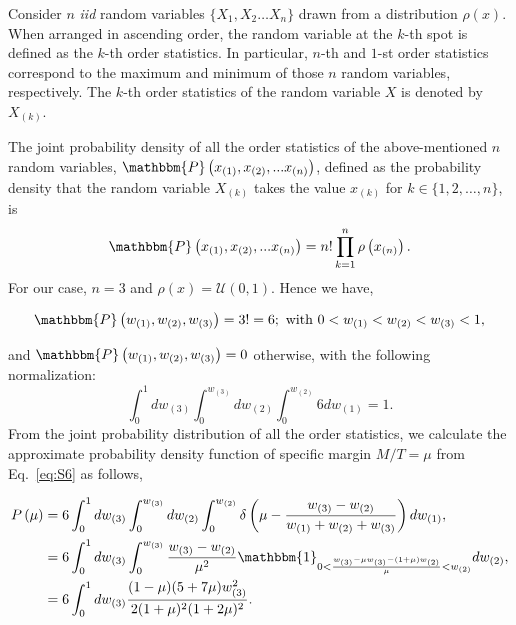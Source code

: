 \documentclass[reprint,aps,prl,showpacs,twocolumn, superscriptaddress]{revtex4-2}
\begin{document}
Consider $n$ \emph{iid} random variables $\{X_1, X_2 \dots X_n\}$ drawn from a distribution $\rho(x)$. When arranged in ascending order, the random variable at the $k$-th spot is defined as the $k$-th order statistics. In particular, $n$-th and $1$-st order statistics correspond to the maximum and minimum of those $n$ random variables, respectively. The $k$-th order statistics of the random variable $X$ is denoted by $X_{(k)}$.

The joint probability density of all the order statistics of the above-mentioned $n$ random variables, $\mathbbm{P}\left(x_{(1)}, x_{(2)}, ... x_{(n)}\right)$, defined as the probability density that the random variable $X_{(k)}$ takes the value $x_{(k)}$ for $k \in \{ 1, 2, \dots, n\}$, is
\begin{equation}
    \mathbbm{P}\left(x_{(1)}, x_{(2)}, ... x_{(n)}\right) = n!\prod_{k=1}^{n}\rho\left(x_{(n)}\right).
\end{equation}
For our case, $n = 3$ and $\rho(x) = \mathcal{U}(0, 1)$. Hence we have,
\begin{center}
    \begin{align}
        \mathbbm{P}\left(w_{(1)}, w_{(2)}, w_{(3)}\right) = 3! = 6; \text{ with } 0<w_{(1)}<w_{(2)}<w_{(3)}<1,
    \end{align}
\end{center}
and $\mathbbm{P}\left(w_{(1)}, w_{(2)}, w_{(3)}\right) = 0$ otherwise, with the following normalization:
\begin{equation}
    \int_{0}^{1}dw_{(3)}\int_{0}^{w_{(3)}}dw_{(2)}\int_{0}^{w_{(2)}} 6 dw_{(1)} = 1.
\end{equation}
From the joint probability distribution of all the order statistics, we calculate the approximate probability density function of specific margin $ M / T = \mu$ from Eq.~\eqref{eq:S6} as follows, 
\begin{center}
    \begin{align}
        \nonumber P\left(\mu\right) & = 6 \nonumber \int_{0}^{1}dw_{(3)}\int_{0}^{w_{(3)}}dw_{(2)}\int_{0}^{w_{(2)}} \delta\left(\mu - \frac{w_{(3)}- w_{(2)}}{w_{(1)} + w_{(2)} + w_{(3)}}\right)dw_{(1)},\\
        & = 6 \int_{0}^{1}dw_{(3)}\int_{0}^{w_{(3)}} \frac{w_{(3)} - w_{(2)}}{\mu^2} \nonumber \mathbbm{1}_{0<\frac{w_{(3)} - \mu w_{(3)} - (1 + \mu)w_{(2)}}{\mu}<w_{(2)}} dw_{(2)},\\
        & = 6 \int_{0}^{1}dw_{(3)} \frac{(1 - \mu)(5 + 7\mu)w_{(3)}^2}{2(1 + \mu)^2(1 + 2\mu)^2}.\\
    \end{align}
\end{center}
\end{document}
